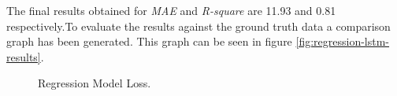 The final results obtained for \textit{MAE} and \textit{R-square} are 11.93 and 0.81 respectively.To evaluate the results against the ground truth data a comparison graph has been generated. This graph can be seen in figure \ref{fig:regression-lstm-results}.

\begin{figure}
\begin{center}
\end{center}
\decoRule
\caption[Regression Model Loss]{Regression Model Loss.}
\label{fig:regression-lstm-loss}\end{figure}

